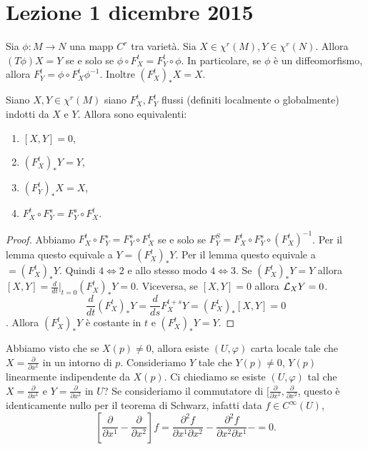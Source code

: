 \chapter{Lezione 1 dicembre 2015}

Sia $\phi:M\to N$ una mapp $C^r$ tra varietà. Sia $X\in\chi^r(M),Y\in \chi^r(N)$. Allora $(T\phi)X=Y$ se e solo se $\phi\circ F_X^t=F_Y^t\circ \phi$. In particolare, se $\phi$ è un diffeomorfismo, allora $F_Y^t=\phi\circ F_X^t\phi^{-1}$. Inoltre $(F_X^t)_*X=X$.

\begin{proposition}
 Siano $X,Y\in\chi^r(M)$  siano $F_X^t,F_Y^t$ flussi (definiti localmente o globalmente) indotti da $X$ e $Y$. Allora sono equivalenti:
 \begin{enumerate}
  \item $[X,Y]=0$,
  \item $(F_X^t)_*Y=Y$, 
  \item $(F_Y^t)_*X=X$, 
  \item $F_X^t\circ F_Y^s=F_Y^s\circ F_X^t$.
 \end{enumerate}

\end{proposition}

\begin{proof}
 Abbiamo $F_X^t\circ F_Y^s=F_Y^s\circ F_X^t$ se e solo se $F_Y^S=F_X^t\circ F_Y^s\circ (F_X^t)^{-1}$. Per il lemma questo equivale a $Y=(F_X^t)_*Y$. Per il lemma questo equivale a $=(F_X^t)_*Y$. Quindi $4\iff 2$ e allo stesso modo $4\iff 3$. Se $(F_X^t)_*Y=Y$ allora $[X,Y]=\frac{d}{dt}|_{t=0}(F_X^t)_*Y=0$. Viceversa, se $[X,Y]=0$ allora $\mathcal L_XY=0$. \[\frac{d}{dt}(F_X^t)_*Y=\frac{d}{ds}F_X^{t+s}Y=(F_X^t)_*[X,Y]=0\]. Allora  $(F_X^t)_*Y$ è costante in $t$ e $(F_X^t)_*Y=Y$.
\end{proof}

Abbiamo visto che se $X(p)\neq 0$, allora esiste $(U,\varphi)$ carta locale tale che $X=\frac{\partial}{\partial x^1}$ in un intorno di $p$. Consideriamo $Y$ tale che $Y(p)\neq 0$, $Y(p)$ linearmente indipendente da $X(p)$. Ci chiediamo se esiste $(U,\varphi)$ tal che $X=\frac{\partial}{\partial x^1}$ e $Y=\frac{\partial}{\partial x^2}$ in $U$? Se consideriamo il commutatore di $[\frac{\partial}{\partial x^1},\frac{\partial}{\partial x^2}$, questo è identicamente nullo per il teorema di Schwarz, infatti data $f\in C^\infty(U)$, \[[\frac{\partial}{\partial x^1}-\frac{\partial}{\partial x^2}]f=\frac{\partial^2f}{\partial x^1\partial x^2}-\frac{\partial^2f}{\partial x^2\partial x^1}-=0.\]

